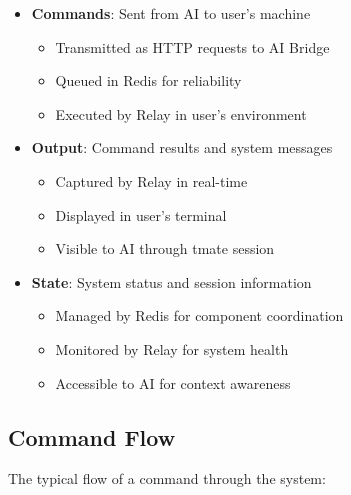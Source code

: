 \documentclass{article}
\begin{document}
\begin{itemize}
    \item \textbf{Commands}: Sent from AI to user's machine
    \begin{itemize}
        \item Transmitted as HTTP requests to AI Bridge
        \item Queued in Redis for reliability
        \item Executed by Relay in user's environment
    \end{itemize}
    
    \item \textbf{Output}: Command results and system messages
    \begin{itemize}
        \item Captured by Relay in real-time
        \item Displayed in user's terminal
        \item Visible to AI through tmate session
    \end{itemize}
    
    \item \textbf{State}: System status and session information
    \begin{itemize}
        \item Managed by Redis for component coordination
        \item Monitored by Relay for system health
        \item Accessible to AI for context awareness
    \end{itemize}
\end{itemize}

\subsection{Command Flow}
The typical flow of a command through the system:
\end{document}
